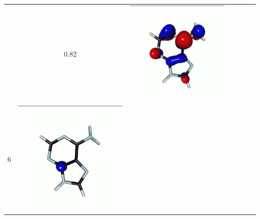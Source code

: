 \documentclass[journal=jctcce,manuscript=article]{achemso}
\begin{document}
\begin{table}[H]
\begin{tabular}{ l| c c c | c c c }
\begin{minipage}{0.2\textwidth}
    \end{minipage}
    & 0.82
    & 
    \begin{minipage}{0.2\textwidth}
        \centering
        \includegraphics[scale=0.10]{NTO/Adenine_C/5p_Cs.png}
    \end{minipage}
    \\
            6 &  
    \begin{minipage}{0.2\textwidth}
        \centering
        \includegraphics[scale=0.10]{NTO/Adenine_C/6h_C1.png}

\end{minipage}
\end{tabular}
\end{table}
\end{document}
